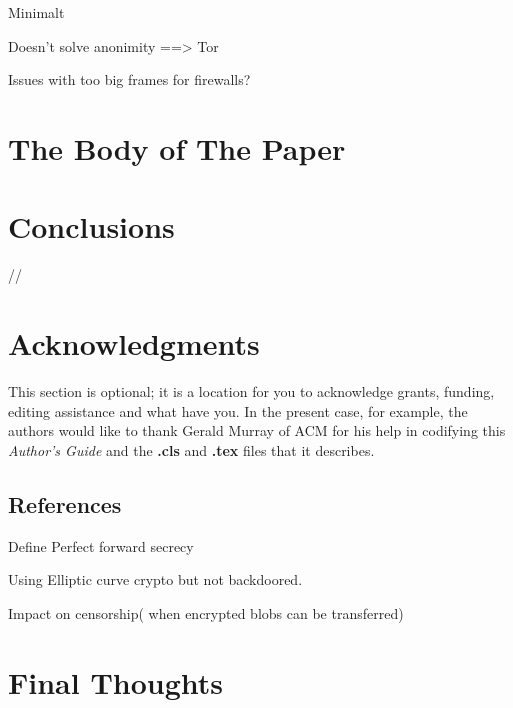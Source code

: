 \documentclass{vldb}
\begin{document}
Minimalt 

Doesn't solve anonimity ==> Tor

Issues with too big frames for firewalls?
\section{The {\secit Body} of The Paper}
\section{Conclusions}

//\balance

\section{Acknowledgments}
This section is optional; it is a location for you
to acknowledge grants, funding, editing assistance and
what have you.  In the present case, for example, the
authors would like to thank Gerald Murray of ACM for
his help in codifying this \textit{Author's Guide}
and the \textbf{.cls} and \textbf{.tex} files that it describes.



\subsection{References}

\begin{appendix}
Define Perfect forward secrecy

Using Elliptic curve crypto but not backdoored.

Impact on censorship( when encrypted blobs can be transferred)
\section{Final Thoughts}

\end{appendix}
\end{document}

